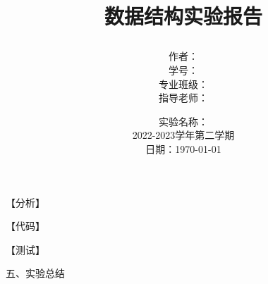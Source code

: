 \documentclass[11pt,twoside,a4paper]{ctexart}
\title{
    \begin{huge}
    \textbf{数据结构实验报告}
    \author{作者：\\
    学号：\\
    专业班级：\\
    指导老师：}
    \date{实验名称：\\
    2022-2023学年第二学期\\
    日期：\today}
    \end{huge}
}
\begin{document}
\maketitle
\newpage

\begin{Large}
\end{Large}

\begin{Large}
\end{Large}

\begin{Large}
\end{Large}

\begin{Large}
\end{Large}

【分析】

【代码】



【测试】

五、实验总结
\end{document}
